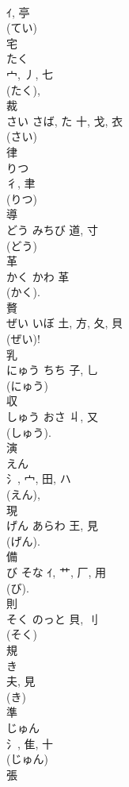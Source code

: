 \documentclass[8pt]{extreport}
\begin{document}
\begin{CJK}{UTF8}{min}
\\	ｲ, 亭	
\\	(てい) 
\\	宅	
\\	たく	
\\	宀, 丿, 七	
\\	(たく), 
\\	裁	
\\	さい	さば, た	十, 戈, 衣	
\\	(さい) 
\\	律	
\\	りつ	
\\	彳, 聿	
\\	(りつ) 
\\	導	
\\	どう	みちび	道, 寸	
\\	(どう) 
\\	革	
\\	かく	かわ	革	
\\	(かく). 
\\	贅	
\\	ぜい	いぼ	土, 方, 夂, 貝	
\\	(ぜい)!	
\\	乳	
\\	にゅう	ちち	子, 乚		
\\	(にゅう) 
\\	収	
\\	しゅう	おさ	丩, 又	
\\	(しゅう). 
\\	演	
\\	えん	
\\	氵, 宀, 田, ハ		
\\	(えん), 
\\	現	
\\	げん	あらわ	王, 見	
\\	(げん). 
\\	備	
\\	び	そな	ｲ, 艹, 厂, 用	
\\	(び).	
\\	則	
\\	そく	のっと	貝, 刂	
\\	(そく) 
\\	規	
\\	き	
\\	夫, 見	
\\	(き) 
\\	準	
\\	じゅん	
\\	氵, 隹, 十	
\\	(じゅん) 
\\	張	

\end{CJK}
\end{document}
